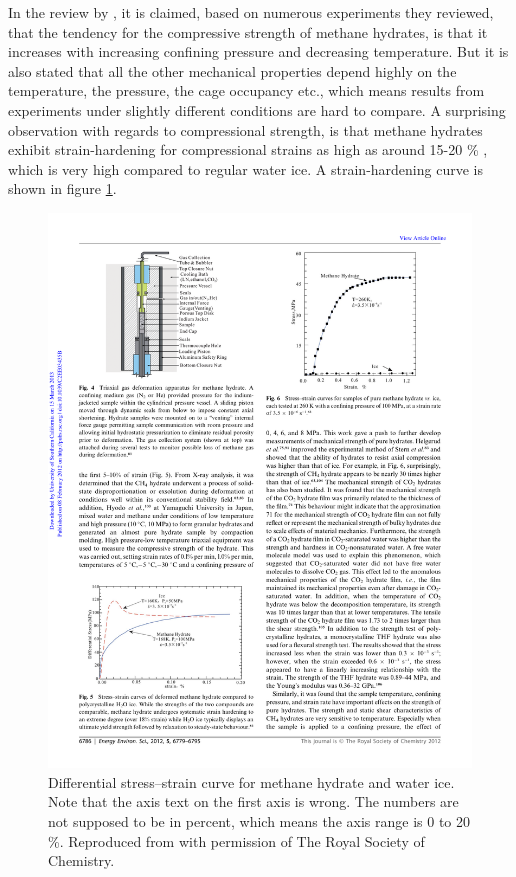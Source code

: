 In the review by \citet{Ning2012}, it is claimed, based on numerous experiments they reviewed, that the tendency for the compressive strength of methane hydrates, is that it increases with increasing confining pressure and decreasing temperature. But it is also stated that all the other mechanical properties depend highly on the temperature, the pressure, the cage occupancy etc., which means results from experiments under slightly different conditions are hard to compare. A surprising observation with regards to compressional strength, is that methane hydrates exhibit strain-hardening for compressional strains as high as around 15-20 \% \cite{Durham2003, Stern1998}, which is very high compared to regular water ice. A strain-hardening curve is shown in figure \ref{fig:strain_hardening}.

\begin{figure}
\centering
\includegraphics[width=12cm]{../pictures/differential_stress_hydrate.pdf}
\caption{Differential stress–strain curve for methane hydrate and water ice. Note that the axis text on the first axis is wrong. The numbers are not supposed to be in percent, which means the axis range is 0 to 20 \%. Reproduced from \cite{Ning2012} with permission of The Royal Society of Chemistry.}
\label{fig:strain_hardening}
\end{figure}

